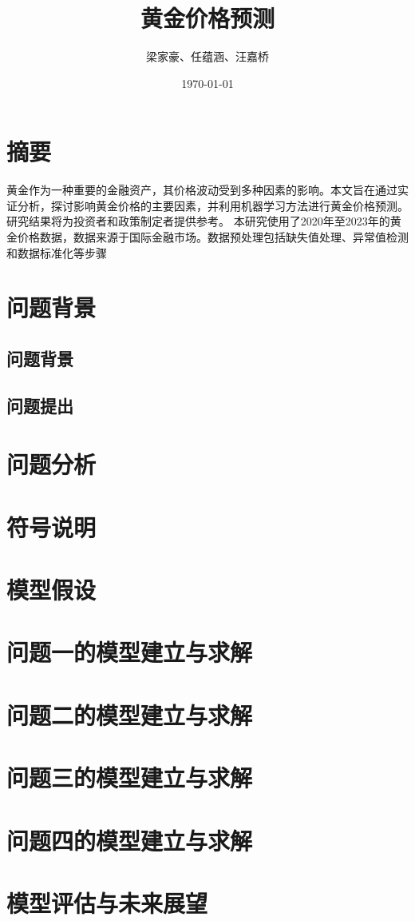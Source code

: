 \documentclass{ctexart}
\title{黄金价格预测}
\author{梁家豪、任蕴涵、汪嘉桥}
\date{\today}
\begin{document}
\maketitle
\section{摘要}
黄金作为一种重要的金融资产，其价格波动受到多种因素的影响。本文旨在通过实证分析，探讨影响黄金价格的主要因素，并利用机器学习方法进行黄金价格预测。研究结果将为投资者和政策制定者提供参考。
本研究使用了2020年至2023年的黄金价格数据，数据来源于国际金融市场。数据预处理包括缺失值处理、异常值检测和数据标准化等步骤      

\section{问题背景}
\subsection{问题背景}
\subsection{问题提出}

\section{问题分析}

\section{符号说明}


\section{模型假设}

\section{问题一的模型建立与求解}

\section{问题二的模型建立与求解}

\section{问题三的模型建立与求解}

\section{问题四的模型建立与求解}

\section{模型评估与未来展望}
\end{document}
